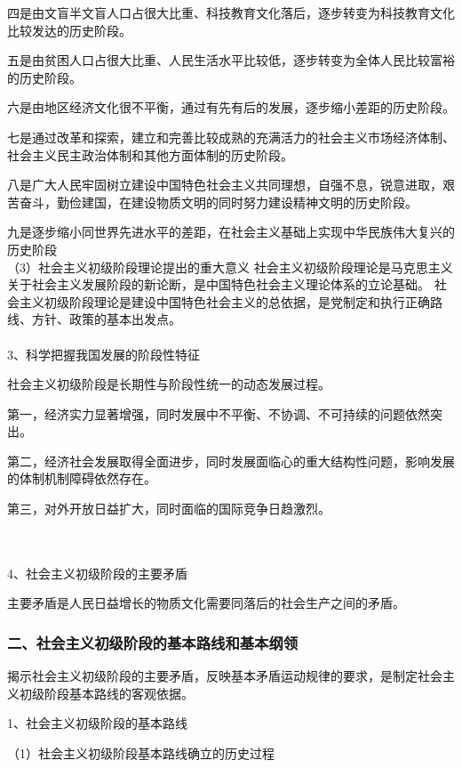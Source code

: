 \documentclass{ctexart}
\begin{document}
四是由文盲半文盲人口占很大比重、科技教育文化落后，逐步转变为科技教育文化比较发达的历史阶段。

五是由贫困人口占很大比重、人民生活水平比较低，逐步转变为全体人民比较富裕的历史阶段。

六是由地区经济文化很不平衡，通过有先有后的发展，逐步缩小差距的历史阶段。

七是通过改革和探索，建立和完善比较成熟的充满活力的社会主义市场经济体制、社会主义民主政治体制和其他方面体制的历史阶段。

八是广大人民牢固树立建设中国特色社会主义共同理想，自强不息，锐意进取，艰苦奋斗，勤俭建国，在建设物质文明的同时努力建设精神文明的历史阶段。

九是逐步缩小同世界先进水平的差距，在社会主义基础上实现中华民族伟大复兴的历史阶段
\\
（3）社会主义初级阶段理论提出的重大意义
社会主义初级阶段理论是马克思主义关于社会主义发展阶段的新论断，是中国特色社会主义理论体系的立论基础。
社会主义初级阶段理论是建设中国特色社会主义的总依据，是党制定和执行正确路线、方针、政策的基本出发点。
\\\\

3、科学把握我国发展的阶段性特征

社会主义初级阶段是长期性与阶段性统一的动态发展过程。

第一，经济实力显著增强，同时发展中不平衡、不协调、不可持续的问题依然突出。

第二，经济社会发展取得全面进步，同时发展面临心的重大结构性问题，影响发展的体制机制障碍依然存在。

第三，对外开放日益扩大，同时面临的国际竞争日趋激烈。

\\\\

4、社会主义初级阶段的主要矛盾

主要矛盾是人民日益增长的物质文化需要同落后的社会生产之间的矛盾。



\subsubsection{二、社会主义初级阶段的基本路线和基本纲领}

揭示社会主义初级阶段的主要矛盾，反映基本矛盾运动规律的要求，是制定社会主义初级阶段基本路线的客观依据。

1、社会主义初级阶段的基本路线

（1）社会主义初级阶段基本路线确立的历史过程
\end{document}
